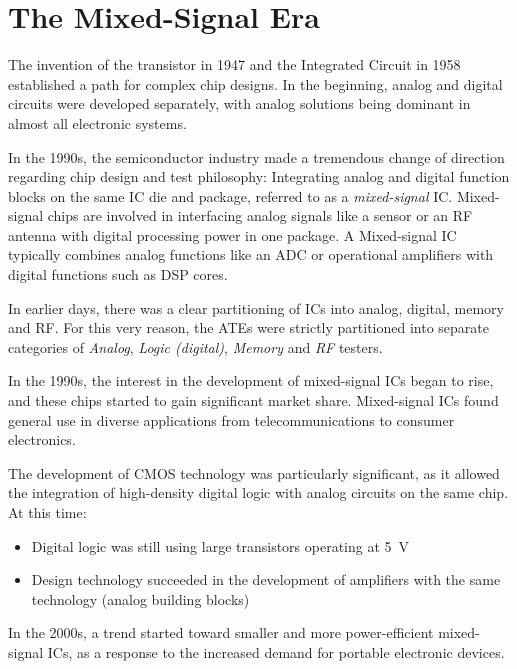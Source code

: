 

\section{The Mixed-Signal Era}
\label{sec:mixed-signal-era}

The invention of the transistor in 1947 and the Integrated Circuit in 1958
established a path for complex chip designs.
In the beginning, analog and digital circuits were developed separately, with
analog solutions being dominant in almost all electronic systems.

In the 1990s, the semiconductor industry made a tremendous change of
direction regarding chip design and test philosophy: Integrating analog and
digital function blocks on the same \ac{IC} die and package, referred to as
a \emph{mixed-signal} \ac{IC}.
Mixed-signal chips are involved in interfacing analog signals like a
sensor or an \ac{RF} antenna with digital processing power in one package.
A Mixed-signal \ac{IC} typically combines analog functions like
an \ac{ADC} or operational amplifiers with digital functions such as
\ac{DSP} cores.

In earlier days, there was a clear partitioning of \ac{IC}s into analog,
digital, memory and \ac{RF}.
For this very reason, the \acp{ATE} were strictly partitioned into separate
categories of \emph{Analog}, \emph{Logic (digital)}, \emph{Memory}
and \emph{\acs{RF}} testers.

In the 1990s, the interest in the development of mixed-signal \acp{IC}
began to rise, and these chips started to gain
significant market share.
Mixed-signal \acp{IC} found general use in diverse
applications from telecommunications to consumer electronics.

The development of \ac{CMOS} technology was particularly significant, as it allowed
the integration of high-density digital logic with analog circuits on
the same chip.
At this time:

\begin{itemize}[topsep=8pt,itemsep=4pt,partopsep=4pt, parsep=4pt]
    \item Digital logic was still using large transistors
    operating at \SI{5}{\volt}
    \item Design technology succeeded in the development of amplifiers with the
    same technology (analog building blocks)
\end{itemize}

In the 2000s, a trend started toward smaller and more power-efficient
mixed-signal \ac{IC}s, as a response to the increased demand for portable
electronic devices.


